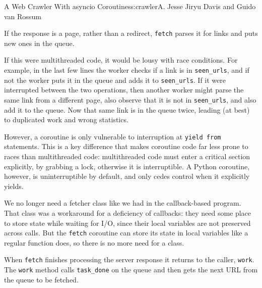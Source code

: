 \begin{aosachapter}{A Web Crawler With asyncio Coroutines}{s:crawler}{A. Jesse Jiryu Davis and Guido van Rossum}
\begin{Shaded}
\begin{Highlighting}[]
                \NormalTok{))}
         \NormalTok{:}
               
              
\end{Highlighting}
\end{Shaded}

If the response is a page, rather than a redirect, \texttt{fetch} parses
it for links and puts new ones in the queue.

If this were multithreaded code, it would be lousy with race conditions.
For example, in the last few lines the worker checks if a link is in
\texttt{seen\_urls}, and if not the worker puts it in the queue and adds
it to \texttt{seen\_urls}. If it were interrupted between the two
operations, then another worker might parse the same link from a
different page, also observe that it is not in \texttt{seen\_urls}, and
also add it to the queue. Now that same link is in the queue twice,
leading (at best) to duplicated work and wrong statistics.

However, a coroutine is only vulnerable to interruption at
\texttt{yield from} statements. This is a key difference that makes
coroutine code far less prone to races than multithreaded code:
multithreaded code must enter a critical section explicitly, by grabbing
a lock, otherwise it is interruptible. A Python coroutine, however, is
uninterruptible by default, and only cedes control when it explicitly
yields.

We no longer need a fetcher class like we had in the callback-based
program. That class was a workaround for a deficiency of callbacks: they
need some place to store state while waiting for I/O, since their local
variables are not preserved across calls. But the \texttt{fetch}
coroutine can store its state in local variables like a regular function
does, so there is no more need for a class.

When \texttt{fetch} finishes processing the server response it returns
to the caller, \texttt{work}. The \texttt{work} method calls
\texttt{task\_done} on the queue and then gets the next URL from the
queue to be fetched.


\end{aosachapter}
